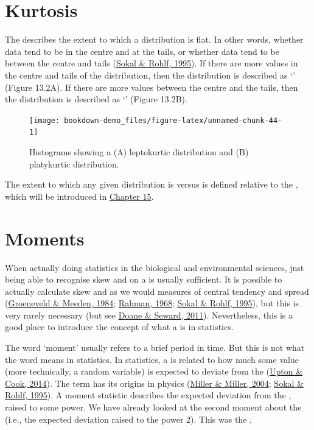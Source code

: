 \documentclass[
  openany]{krantz}
\begin{document}
\hypertarget{kurtosis}{%
\section{Kurtosis}\label{kurtosis}}

The \textbf{} describes the extent to which a distribution is flat.
In other words, whether data tend to be in the centre and at the tails, or whether data tend to be between the centre and tails (\protect\hyperlink{ref-Sokal1995}{Sokal \& Rohlf, 1995}).
If there are more values in the centre and tails of the distribution, then the distribution is described as `' (Figure 13.2A).
If there are more values between the centre and the tails, then the distribution is described as `' (Figure 13.2B).

\begin{figure}
\texttt{[image: bookdown-demo\_files/figure-latex/unnamed-chunk-44-1]} \caption{Histograms showing a (A) leptokurtic distribution and (B) platykurtic distribution.}\label{fig:unnamed-chunk-44}
\end{figure}

The extent to which any given distribution is  versus  is defined relative to the , which will be introduced in \protect\hyperlink{Chapter_15}{Chapter 15}.

\hypertarget{moments}{%
\section{Moments}\label{moments}}

When actually doing statistics in the biological and environmental sciences, just being able to recognise skew and  on a  is usually sufficient.
It is possible to actually calculate skew and  as we would measures of central tendency and spread (\protect\hyperlink{ref-Groeneveld1984}{Groeneveld \& Meeden, 1984}; \protect\hyperlink{ref-Rahman1968}{Rahman, 1968}; \protect\hyperlink{ref-Sokal1995}{Sokal \& Rohlf, 1995}), but this is very rarely necessary (but see \protect\hyperlink{ref-Doane2011}{Doane \& Seward, 2011}).
Nevertheless, this is a good place to introduce the concept of what a  is in statistics.

The word `moment' usually refers to a brief period in time.
But this is not what the word means in statistics.
In statistics, a \textbf{} is related to how much some value (more technically, a random variable) is expected to deviate from the  (\protect\hyperlink{ref-Upton2014}{Upton \& Cook, 2014}).
The term has its origins in physics (\protect\hyperlink{ref-Miller2004}{Miller \& Miller, 2004}; \protect\hyperlink{ref-Sokal1995}{Sokal \& Rohlf, 1995}).
A moment statistic describes the expected deviation from the , raised to some power.
We have already looked at the second moment about the  (i.e., the expected deviation raised to the power 2).
This was the ,
\end{document}
